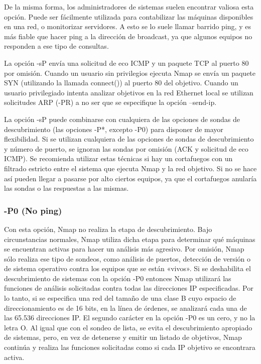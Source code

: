 \documentclass[a4paper, 11pt, titlepage]{book}
\begin{document}
            De la misma forma, los administradores de sistemas suelen encontrar valiosa esta opción. 
            Puede ser fácilmente utilizada para contabilizar las máquinas disponibles en una red, o 
            monitorizar servidores. A esto se lo suele llamar barrido ping, y es más fiable que hacer 
            ping a la dirección de broadcast, ya que algunos equipos no responden a ese tipo de consultas.

            La opción -sP envía una solicitud de eco ICMP y un paquete TCP al puerto 80 por omisión. 
            Cuando un usuario sin privilegios ejecuta Nmap se envía un paquete SYN (utilizando la llamada 
            connect()) al puerto 80 del objetivo. Cuando un usuario privilegiado intenta analizar objetivos 
            en la red Ethernet local se utilizan solicitudes ARP (-PR) a no ser que se especifique la 
            opción --send-ip.

            La opción -sP puede combinarse con cualquiera de las opciones de sondas de descubrimiento 
            (las opciones -P*, excepto -P0) para disponer de mayor flexibilidad. Si se utilizan cualquiera 
            de las opciones de sondas de descubrimiento y número de puerto, se ignoran las sondas por omisión 
            (ACK y solicitud de eco ICMP). Se recomienda utilizar estas técnicas si hay un cortafuegos con un 
            filtrado estricto entre el sistema que ejecuta Nmap y la red objetivo. Si no se hace así pueden 
            llegar a pasarse por alto ciertos equipos, ya que el cortafuegos anularía las sondas o las 
            respuestas a las mismas.

            \subsubsection{-P0 (No ping)} Con esta opción, Nmap no realiza la etapa de descubrimiento. 
            Bajo circunstancias normales, Nmap utiliza dicha etapa para determinar qué máquinas se encuentran 
            activas para hacer un análisis más agresivo. Por omisión, Nmap sólo realiza ese tipo de sondeos, 
            como análisis de puertos, detección de versión o de sistema operativo contra los equipos que se 
            están «vivos». Si se deshabilita el descubrimiento de sistemas con la opción -P0 entonces Nmap 
            utilizará las funciones de análisis solicitadas contra todas las direcciones IP especificadas. 
            Por lo tanto, si se especifica una red del tamaño de una clase B cuyo espacio de direccionamiento 
            es de 16 bits, en la línea de órdenes, se analizará cada una de las 65.536 direcciones IP. El 
            segundo carácter en la opción -P0 es un cero, y no la letra O. Al igual que con el sondeo de lista, 
            se evita el descubrimiento apropiado de sistemas, pero, en vez de detenerse y emitir un listado de 
            objetivos, Nmap continúa y realiza las funciones solicitadas como si cada IP objetivo se encontrara 
            activa.
\end{document}
